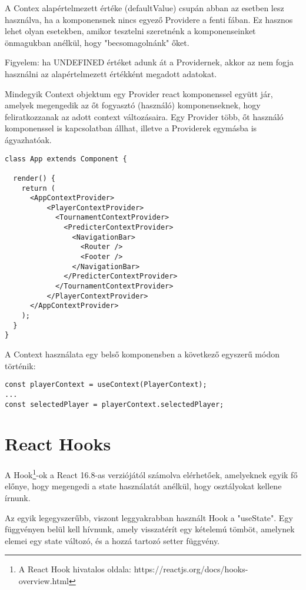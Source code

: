 A Contex alapértelmezett értéke (defaultValue) csupán abban az esetben lesz használva, ha a komponensnek nincs egyező Providere a fenti fában. Ez hasznos lehet olyan esetekben, amikor tesztelni szeretnénk a komponenseinket önmagukban anélkül, hogy "becsomagolnánk" őket.

Figyelem: ha UNDEFINED értéket adunk át a Providernek, akkor az nem fogja használni az alapértelmezett értékként megadott adatokat. 

Mindegyik Context objektum egy Provider react komponenssel együtt jár, amelyek megengedik az őt fogyasztó (használó) komponenseknek, hogy feliratkozzanak az adott context változásaira. Egy Provider több, őt használó komponenssel is kapcsolatban állhat, illetve a Providerek egymásba is ágyazhatóak.

\begin{lstlisting}[caption=A Providerek egymásba ágyazása]
class App extends Component {

  render() {
    return (
      <AppContextProvider>
          <PlayerContextProvider>
            <TournamentContextProvider>
              <PredicterContextProvider>
                <NavigationBar>
                  <Router />
                  <Footer />
                </NavigationBar>
              </PredicterContextProvider>
            </TournamentContextProvider>
          </PlayerContextProvider>
      </AppContextProvider>
    );
  }
}
\end{lstlisting}

A Context használata egy belső komponensben a következő egyszerű módon történik:
\begin{lstlisting}[caption=A Context értékének a felhasználása]
const playerContext = useContext(PlayerContext);
...
const selectedPlayer = playerContext.selectedPlayer;
\end{lstlisting}

\section{React Hooks}
\paragraph{}
A Hook\footnote{A React Hook hivatalos oldala: https://reactjs.org/docs/hooks-overview.html}-ok a React 16.8-as verziójától számolva elérhetőek, amelyeknek egyik fő előnye, hogy megengedi a state használatát anélkül, hogy osztályokat kellene írnunk.

Az egyik legegyszerűbb, viszont leggyakrabban használt Hook a "useState". Egy függvényen belül kell hívnunk, amely visszatérít egy kételemú tömböt, amelynek elemei egy state változó, és a hozzá tartozó setter függvény.


